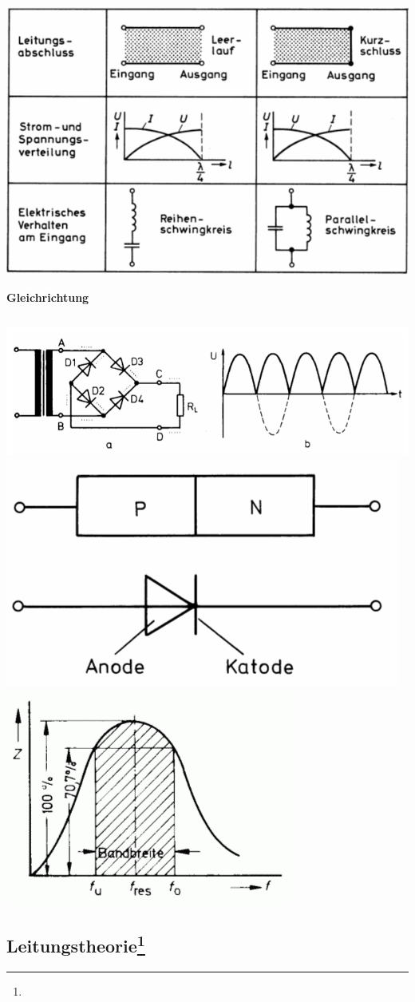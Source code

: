 \documentclass[12pt,a4paper, twoside]{article}
\renewcommand{\=}[1]{\stackrel{#1}{=}}
\theoremstyle{definition}
\theoremstyle{remark}
\newcommand{\concept}[2]{%
\noindent
\begin{framed}
\noindent\textbf{#1}
\par\begin{tabular}{p{\linewidth}}
#2
\end{tabular}
\end{framed}
}
\begin{document}
\includegraphics[width=0.9\linewidth]{pic/lecherleitung.png}


\concept{Gleichrichtung}{

}

\includegraphics[width=\linewidth]{pic/fbr.png}\\
\includegraphics[width=0.55\linewidth]{pic/pn-ak.png}
\includegraphics[width=0.40\linewidth]{pic/bandbreite.png}



\subsection[Leitungstheorie]{Leitungstheorie\let\thefootnote\relax\footnote{}}
\end{document}
